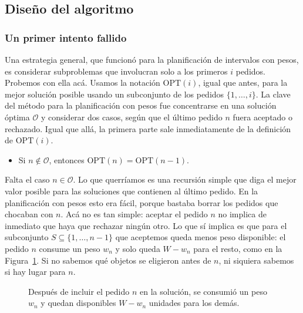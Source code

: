 \documentclass[12pt, spanish, oneside, openany]{book}
\theoremstyle{uprightplain}
\theoremstyle{definition}
\theoremstyle{remark}
\theoremstyle{definition}
\newcommand{\OPT}{\mathrm{OPT}} %
\begin{document}
\subsection{Diseño del algoritmo}

\subsubsection{Un primer intento fallido}

Una estrategia general, que funcionó para la planificación de intervalos con pesos, es considerar subproblemas que involucran solo a los primeros $i$ pedidos. Probemos con ella acá. Usamos la notación $\OPT(i)$, igual que antes, para la mejor solución posible usando un subconjunto de los pedidos $\{1,\dots,i\}$. La clave del método para la planificación con pesos fue concentrarse en una solución óptima $\mathcal{O}$ y considerar dos casos, según que el último pedido $n$ fuera aceptado o rechazado. Igual que allá, la primera parte sale inmediatamente de la definición de $\OPT(i)$.
\begin{itemize}
    \item Si $n\notin\mathcal{O}$, entonces $\OPT(n)=\OPT(n-1)$.
\end{itemize}

Falta el caso $n\in\mathcal{O}$. Lo que querríamos es una recursión simple que diga el mejor valor posible para las soluciones que contienen al último pedido. En la planificación con pesos esto era fácil, porque bastaba borrar los pedidos que chocaban con $n$. Acá no es tan simple: aceptar el pedido $n$ no implica de inmediato que haya que rechazar ningún otro. Lo que sí implica es que para el subconjunto $S\subseteq\{1,\dots,n-1\}$ que aceptemos queda menos peso disponible: el pedido $n$ consume un peso $w_n$ y solo queda $W-w_n$ para el resto, como en la Figura~\ref{fig:dp-mochila-capacidad}. Si no sabemos qué objetos se eligieron antes de $n$, ni siquiera sabemos si hay lugar para $n$.

\begin{figure}[H]
\centering
{}
\caption{Después de incluir el pedido $n$ en la solución, se consumió un peso
$w_n$ y quedan disponibles $W-w_n$ unidades para los demás.}
\label{fig:dp-mochila-capacidad}
\end{figure}
\end{document}
